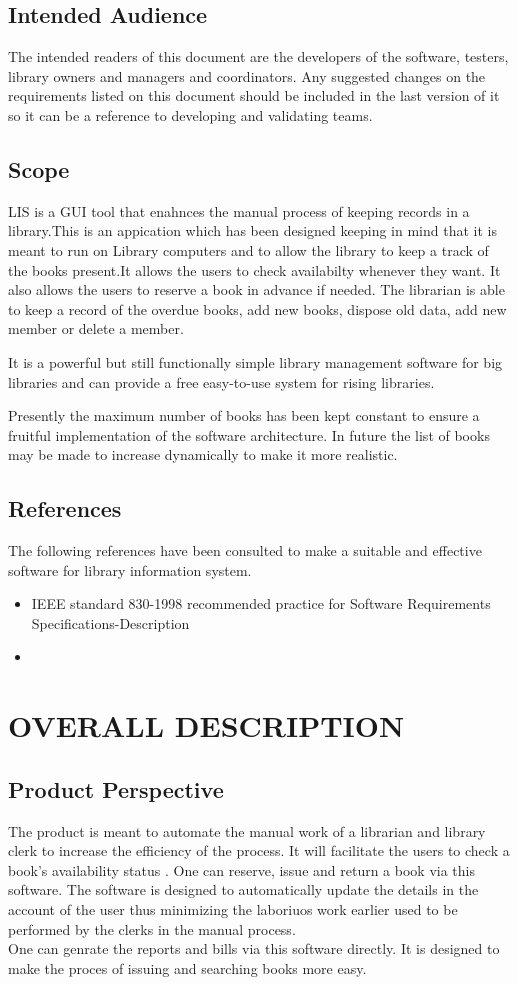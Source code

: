 \documentclass{article}
\begin{document}
\subsection{Intended Audience}
The intended readers of this document are the developers of the software, testers, library owners
and managers and coordinators.
Any suggested changes on the requirements listed on this document should be included in
the last version of it so it can be a reference to developing and validating teams.
\subsection{Scope}
LIS is a GUI tool that enahnces the manual process of keeping records in a library.This is an appication which has been designed keeping in mind that it is meant to run on Library computers and to allow the library to keep a track of the books present.It allows the users to check availabilty whenever they want. It also allows the users to reserve a book in advance if needed. The librarian is able to keep a record of the overdue books, add new books, dispose old data, add new member or delete a member. 

It is a powerful but still functionally simple library management software for big libraries and can provide a free easy-to-use system for rising libraries.

Presently the maximum number of books has been kept constant to ensure a fruitful implementation of the software architecture. In future the list of books may be made to increase dynamically to make it more realistic.
\subsection{References}
The following references have been consulted to make a suitable and effective software for library information system.

\begin{itemize}
\item IEEE standard 830-1998 recommended practice for Software Requirements Specifications-Description
\item 
\end{itemize}


\section{OVERALL DESCRIPTION}
\subsection{Product Perspective}
The product is meant to automate the manual work of a librarian and library clerk to increase the efficiency of the process. It will facilitate the users to check a book's availability status . One can reserve, issue and return a book via this software. The software is designed to automatically update the details in the account of the user thus minimizing the laboriuos work earlier used to be performed by the clerks in the manual process.
\\
One can genrate the reports and bills via this software directly. It is designed to make the proces of issuing and searching books more easy.
\end{document}
